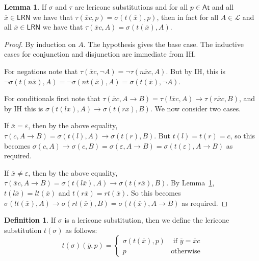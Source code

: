 \documentclass{amsart}
\theoremstyle{definition}
\newtheorem{lemma}{Lemma}
\newtheorem{mdef}{Definition}
\newcommand{\LL}{\mathcal{L}}
\newcommand{\At}{\mathsf{At}}
\newcommand{\LRN}{\mathsf{LRN}}
\begin{document}
\begin{lemma}\label{transform_lemma}
    If $\sigma$ and $\tau$ are lericone substitutions and for all $p\in\At$ and all $\overline{x}\in\LRN$ we have that $\tau(\overline{x}c,p)=\sigma(t(\overline{x}),p)$, then in fact for all $A\in\LL$ and all $\overline{x}\in\LRN$ we have that $\tau(\overline{x}c,A)=\sigma(t(\overline{x}),A)$.
\end{lemma}
\begin{proof}
    By induction on $A$. The hypothesis gives the base case. The inductive cases for conjunction and disjunction are immediate from IH. 

    For negations note that $\tau(\overline{x}c,\neg A)=\neg\tau(n\overline{x}c,A)$. But by IH, this is $\neg\sigma(t(n\overline{x}),A)=\neg\sigma(nt(\overline{x}),A)=\sigma(t(\overline{x}),\neg A)$.

    For conditionals first note that $\tau(\overline{x}c,A\to B)=\tau(l\overline{x}c,A)\to\tau(r\overline{x}c,B)$, and by IH this is $\sigma(t(l\overline{x}),A)\to\sigma(t(r\overline{x}),B)$. We now consider two cases.

    If $\overline{x}=\varepsilon$, then by the above equality, $\tau(c,A\to B)=\sigma(t(l),A)\to\sigma(t(r), B)$. But $t(l)=t(r)=c$, so this becomes $\sigma(c,A)\to\sigma(c,B)=\sigma(\varepsilon,A\to B)=\sigma(t(\varepsilon),A\to B)$ as required.

    If $\overline{x}\neq\varepsilon$, then by the above equality, $\tau(\overline{x}c,A\to B)=\sigma(t(l\overline{x}),A)\to\sigma(t(r\overline{x}),B)$. By Lemma~\ref{transform_lemma}, $t(l\overline{x})=lt(\overline{x})$ and $t(r\overline{x})=rt(\overline{x})$. So this becomes $\sigma(lt(\overline{x}),A)\to\sigma(rt(\overline{x}),B)=\sigma(t(\overline{x}),A\to B)$ as required.
\end{proof}

\begin{mdef}
    If $\sigma$ is a lericone substitution, then we define the lericone substitution $t(\sigma)$ as follows:
    \begin{displaymath}
        t(\sigma)(\overline{y},p) =\left\{
            \begin{array}{lr}
                \sigma(t(\overline{x}),p) & \text{ if }\overline{y}=\overline{x}c \\
                p & \text{otherwise}
            \end{array}\right.
    \end{displaymath}
\end{mdef}
\end{document}
